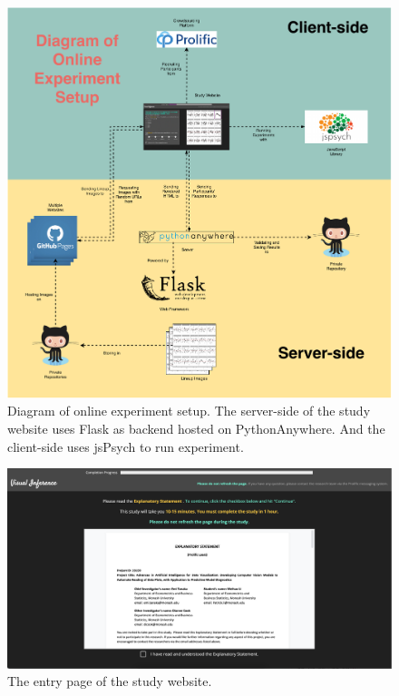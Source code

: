 \documentclass[]{interact}
\theoremstyle{plain}%
\theoremstyle{definition}
\theoremstyle{remark}
\begin{document}
\begin{figure}

{\centering \includegraphics[width=1\linewidth]{figures/experiment_tech} 

}

\caption{Diagram of online experiment setup. The server-side of the study website uses Flask as backend hosted on PythonAnywhere. And the client-side uses jsPsych to run experiment.}\label{fig:tech}
\end{figure}

\begin{figure}

{\centering \includegraphics[width=1\linewidth]{figures/message} 

}

\caption{The entry page of the study website.}\label{fig:entry-page}
\end{figure}
\end{document}
